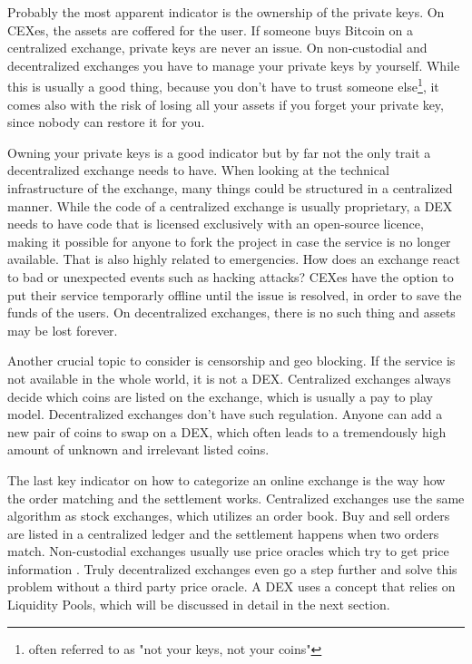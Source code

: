 Probably the most apparent indicator is the ownership of the private keys. On CEXes, the assets are coffered for the user. If someone buys Bitcoin on a centralized exchange, private keys are never an issue. On non-custodial and decentralized exchanges you have to manage your private keys by yourself. While this is usually a good thing, because you don't have to trust someone else\footnote{often referred to as "not your keys, not your coins"}, it comes also with the risk of losing all your assets if you forget your private key, since nobody can restore it for you.

Owning your private keys is a good indicator but by far not the only trait a decentralized exchange needs to have. When looking at the technical infrastructure of the exchange, many things could be structured in a centralized manner. While the code of a centralized exchange is usually proprietary, a DEX needs to have code that is licensed exclusively with an open-source licence, making it possible for anyone to fork the project in case the service is no longer available. That is also highly related to emergencies. How does an exchange react to bad or unexpected events such as hacking attacks? CEXes have the option to put their service temporarly offline until the issue is resolved, in order to save the funds of the users. On decentralized exchanges, there is no such thing and assets may be lost forever.

Another crucial topic to consider is censorship and geo blocking. If the service is not available in the whole world, it is not a DEX. Centralized exchanges always decide which coins are listed on the exchange, which is usually a pay to play model. Decentralized exchanges don't have such regulation. Anyone can add a new pair of coins to swap on a DEX, which often leads to a tremendously high amount of unknown and irrelevant listed coins.

The last key indicator on how to categorize an online exchange is the way how the order matching and the settlement works. Centralized exchanges use the same algorithm as stock exchanges, which utilizes an order book. Buy and sell orders are listed in a centralized ledger and the settlement happens when two orders match. Non-custodial exchanges usually use price oracles which try to get price information \cite[p.\ 47]{WuSun2018}. Truly decentralized exchanges even go a step further and solve this problem without a third party price oracle. A DEX uses a concept that relies on Liquidity Pools, which will be discussed in detail in the next section.


